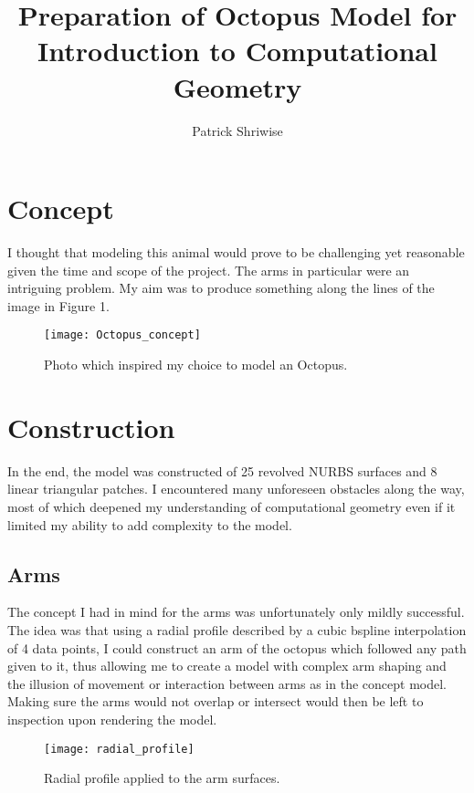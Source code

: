 \documentclass[twocolumn]{article}
\begin{document}
\author{Patrick Shriwise}
\title{Preparation of Octopus Model for Introduction to Computational Geometry	}
\maketitle


\section{Concept}

I thought that modeling this animal would prove to be challenging yet reasonable given the time and scope of the project. The arms in particular were an intriguing problem. My aim was to produce something along the lines of the image in Figure 1. 

\begin{figure}[h!]
\begin{center}
\texttt{[image: Octopus\_concept]}
\end{center}
\caption{Photo which inspired my choice to model an Octopus.}
\end{figure}


\section{Construction}

In the end, the model was constructed of 25 revolved NURBS surfaces and 8 linear triangular patches. I encountered many unforeseen obstacles along the way, most of which deepened my understanding of computational geometry even if it limited my ability to add complexity to the model. 

\subsection{Arms}

The concept I had in mind for the arms was unfortunately only mildly successful. The idea was that using a radial profile described by a cubic bspline interpolation of 4 data points, I could construct an arm of the octopus which followed any path given to it, thus allowing me to create a model with complex arm shaping and the illusion of movement or interaction between arms as in the concept model. Making sure the arms would not overlap or intersect would then be left to inspection upon rendering the model. 

\begin{figure}[h!]
\begin{center}
\texttt{[image: radial\_profile]}
\caption{Radial profile applied to the arm surfaces.}
\end{center}
\end{figure}
\end{document}
